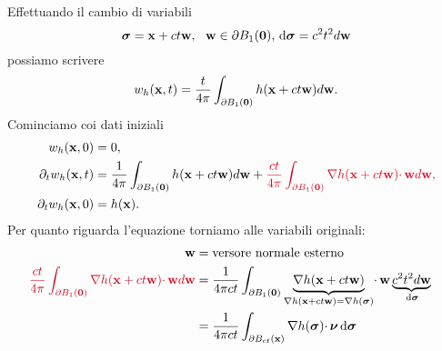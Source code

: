 \begin{dimostrazione}
    Effettuando il cambio di variabili
    \begin{equation*}
        \bm{\sigma} =\mathbf{x} +ct\mathbf{w} ,\ \ \mathbf{w} \in \partial B_{1}(\mathbf{0}) ,\,\mathrm d \bm{\sigma} =c^{2} t^{2} d\mathbf{w}
    \end{equation*}
    possiamo scrivere
    \begin{equation*}
        w_{h}(\mathbf{x} ,t) =\frac{t}{4\pi }\int _{\partial B_{1}(\mathbf{0})} h(\mathbf{x} +ct\mathbf{w}) d\mathbf{w} .
    \end{equation*}
    Cominciamo coi dati iniziali
    \begin{align*}
        w_{h}(\x ,0)               & =0,                                                                                                                                                                                                                  \\
        \partial _{t} w_{h}(\x ,t) & =\frac{1}{4\pi }\int _{\partial B_{1}(\zer)} h(\x +ct\mathbf{w}) d\mathbf{w} +\textcolor[rgb]{0.82,0.01,0.11}{\frac{ct}{4\pi }\int _{\partial B_{1}(\zer)}\nabla h(\x +ct\mathbf{w})\cdotp \mathbf{w} d\mathbf{w} ,} \\
        \partial _{t} w_{h}(\x ,0) & =h(\x) .
    \end{align*}
    Per quanto riguarda l'equazione torniamo alle variabili originali:
    \begin{align*}
        \mathbf{w}                                                                                                                         & =\text{versore normale esterno}                                                                                                                                                                   &                          \\
        \textcolor[rgb]{0.82,0.01,0.11}{\frac{ct}{4\pi }\int _{\partial B_{1}(\zer)}\nabla h(\x+ct\mathbf{w})\cdotp \mathbf{w}d\mathbf{w}} & =\frac{1}{4\pi ct}\int _{\partial B_{1}(\zer)}\underbrace{\nabla h(\x +ct\mathbf{w})}_{\nabla h(\x +ct\mathbf{w}) =\nabla h(\sigg)} \cdotp \mathbf{w}\underbrace{c^{2} t^{2} d\mathbf{w}}_{\dsig} &                          \\
                                                                                                                                           & =\frac{1}{4\pi ct}\int _{\partial B_{ct}(\x)} \nabla h(\sigg) \cdotp \nuu \dsig                                                                                                                   &                          \\

\end{align*}
\end{dimostrazione}
